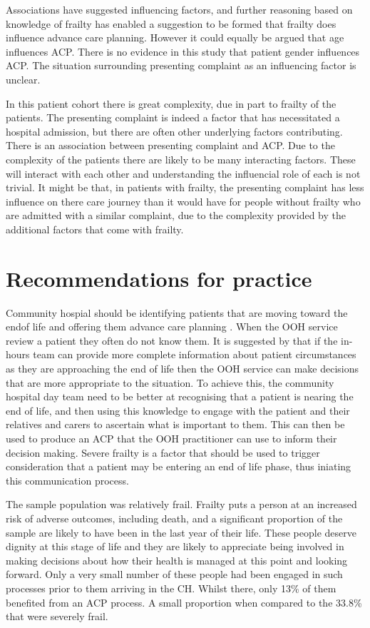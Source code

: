 \documentclass
[
	12pt,
	a4paper,
	oneside,
]{report}
\begin{document}
Associations have suggested influencing factors, and further reasoning based
on knowledge of frailty has enabled a suggestion to be formed that frailty
does influence advance care planning. However it could equally be argued
that age influences ACP. There is no evidence in this study that patient
gender influences ACP. The situation surrounding presenting complaint as
an influencing factor is unclear.

In this patient cohort there is great complexity, due in part to frailty
of the patients. The presenting complaint is indeed a factor that has 
necessitated a hospital admission, but there are often other underlying
factors contributing. There is an association between presenting complaint
and ACP. Due to the complexity of the patients there are likely to be many
interacting factors. These will interact with each other and understanding
the influencial role of each is not trivial.
It might be that, in patients with
frailty, the presenting complaint has less influence on there care journey than
it would have for people without frailty who are admitted with a similar
complaint, due to the complexity provided by the additional factors that
come with frailty.

\section{Recommendations for practice}

Community hospial should be identifying patients that are moving toward the
endof life and offering them advance care planning \parencite{dh:09}.
When the OOH service review a patient they often do not know them. It is 
suggested by \textcite{brettell:18} that if the in-hours team can provide more
complete information about patient circumstances as they are approaching the
end of life then the OOH service can make decisions that are more appropriate
to the situation. To achieve this, the community hospital day team need to be 
better at recognising that a patient is nearing the end of life, and then 
using this knowledge to engage with the patient and their relatives and 
carers to ascertain what is important to them. This can then be used to 
produce an ACP that the OOH practitioner can use to inform their decision
making. Severe frailty is a factor that should be used to trigger consideration
that a patient may be entering an end of life phase, thus iniating this
communication process.

The sample population was relatively frail. Frailty puts a person at an 
increased risk of adverse outcomes, including death, and a significant
proportion of the sample are likely to have been in the last year of their life.
These people deserve dignity at this stage of life and they are likely
to appreciate being involved in making decisions about how their health is
managed at this point and looking forward. Only a very small number of these 
people had been engaged in such processes prior to them arriving in the CH.
Whilst there, only 13\% of them benefited from an ACP process. A small 
proportion when compared to the 33.8\% that were severely frail.
\end{document}
